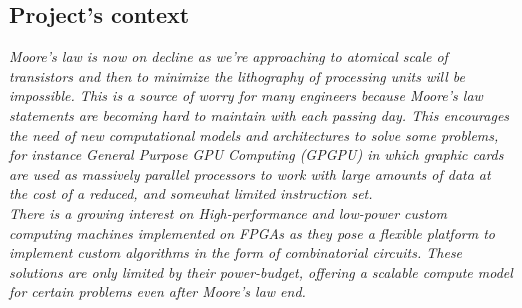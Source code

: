 \documentclass[11pt,letterpaper]{article}
\begin{document}
\subsection{Project's context} 
\emph{
    Moore's law is now on decline as we're approaching to atomical scale of transistors and then to minimize the lithography of processing units will be impossible. This is a source of worry for many engineers because Moore's law statements are becoming hard to maintain with each passing day. This encourages the need of new computational models and architectures to solve some problems, for instance General Purpose GPU Computing (GPGPU) in which graphic cards are used as massively parallel processors to work with large amounts of data at the cost of a reduced, and somewhat limited instruction set.
\\
    There is a growing interest on High-performance and low-power custom computing machines implemented on FPGAs as they pose a flexible platform to implement custom algorithms in the form of combinatorial circuits. These solutions are only limited by their power-budget, offering a scalable compute model for certain problems even after Moore's law end.
\\
}
\end{document}
